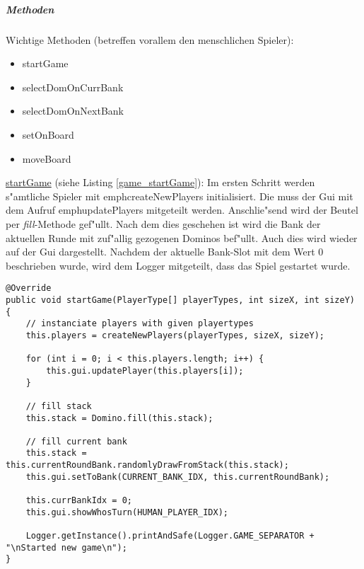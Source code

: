 \subparagraph{Methoden}
Wichtige Methoden (betreffen vorallem den menschlichen Spieler): 
\begin{itemize}
	\item startGame
	\item selectDomOnCurrBank
	\item selectDomOnNextBank
	\item setOnBoard
	\item moveBoard
\end{itemize}

\underline{startGame} (siehe Listing \ref{game_startGame}): Im ersten Schritt werden s"amtliche Spieler mit emph{createNewPlayers} initialisiert. Die muss der Gui mit dem Aufruf emph{updatePlayers} mitgeteilt werden. Anschlie"send wird der Beutel per \emph{fill}-Methode gef"ullt. Nach dem dies geschehen ist wird die Bank der aktuellen Runde mit zuf"allig gezogenen Dominos bef"ullt. Auch dies wird wieder auf der Gui dargestellt. Nachdem der aktuelle Bank-Slot mit dem Wert 0 beschrieben wurde, wird dem Logger mitgeteilt, dass das Spiel gestartet wurde. 
\begin{lstlisting}[float,style=CodeHighlighting,label=game_startGame,caption=Game - startGame]
@Override
public void startGame(PlayerType[] playerTypes, int sizeX, int sizeY) {
    // instanciate players with given playertypes
    this.players = createNewPlayers(playerTypes, sizeX, sizeY);

    for (int i = 0; i < this.players.length; i++) {
        this.gui.updatePlayer(this.players[i]);
    }

    // fill stack
    this.stack = Domino.fill(this.stack);

    // fill current bank
    this.stack = this.currentRoundBank.randomlyDrawFromStack(this.stack);
    this.gui.setToBank(CURRENT_BANK_IDX, this.currentRoundBank);

    this.currBankIdx = 0;
    this.gui.showWhosTurn(HUMAN_PLAYER_IDX);

    Logger.getInstance().printAndSafe(Logger.GAME_SEPARATOR + "\nStarted new game\n");
}
\end{lstlisting}

